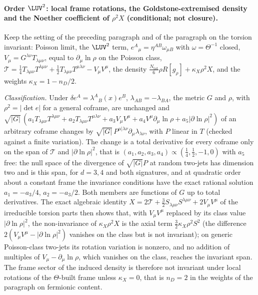 \paragraph{Order \(\LUV^2\): local frame rotations, the Goldstone-extremised density and the Noether coefficient of \(\rho^2X\) (conditional; not closure).}
Keep the setting of the preceding paragraph and of the paragraph on the torsion invariant: Poisson limit, the \(\LUV^2\) term, \(e^A{}_\mu=\eta^{AB}\omega_{\mu B}\) with \(\omega=\Theta^{-1}\) closed, \(V_\mu=G^{\lambda\nu}T_{\lambda\mu\nu}\), equal to \(\partial_\mu\ln\rho\) on the Poisson class, \(\mathcal T=\tfrac14T_{\lambda\mu\nu}T^{\lambda\mu\nu}+\tfrac12T_{\lambda\mu\nu}T^{\mu\lambda\nu}-V_\mu V^\mu\), the density \(\tfrac{N_{\mathrm{tot}}}6\rho R[g_\rho]+\kappa_X\rho^2X\), and the weights \(\kappa_X=1-n_D/2\).

\emph{Classification.} Under \(\delta e^A=\lambda^A{}_B(x)e^B\), \(\lambda_{AB}=-\lambda_{BA}\), the metric \(G\) and \(\rho\), with \(\rho^2=\lvert\det e\rvert\) for a general coframe, are unchanged and \(\sqrt{\lvert G\rvert}\,(a_1T_{\lambda\mu\nu}T^{\lambda\mu\nu}+a_2T_{\lambda\mu\nu}T^{\mu\lambda\nu}+a_3V_\mu V^\mu+a_4V^\mu\partial_\mu\ln\rho+a_5\lvert\partial\ln\rho\rvert^2)\) of an arbitrary coframe changes by \(\sqrt{\lvert G\rvert}\,P^{\mu|\lambda\nu}\partial_\mu\lambda_{\lambda\nu}\), with \(P\) linear in \(T\) (checked against a finite variation). The change is a total derivative for every coframe only on the span of \(\mathcal T\) and \(\lvert\partial\ln\rho\rvert^2\), that is \((a_1,a_2,a_3,a_4)\propto(\tfrac14,\tfrac12,-1,0)\) with \(a_5\) free: the null space of the divergence of \(\sqrt{\lvert G\rvert}P\) at random two-jets has dimension two and is this span, for \(d=3,4\) and both signatures, and at quadratic order about a constant frame the invariance conditions have the exact rational solution \(a_1=-a_3/4\), \(a_2=-a_3/2\). Both members are functions of \(G\) up to total derivatives. The exact algebraic identity \(X=2\mathcal T+\tfrac32S_{\lambda\mu\nu}S^{\lambda\mu\nu}+2V_\mu V^\mu\) of the irreducible torsion parts then shows that, with \(V_\mu V^\mu\) replaced by its class value \(\lvert\partial\ln\rho\rvert^2\), the non-invariance of \(\kappa_X\rho^2X\) is the axial term \(\tfrac32\kappa_X\rho^2S^2\) (the difference \(2(V_\mu V^\mu-\lvert\partial\ln\rho\rvert^2)\) vanishes on the class but is not invariant); on generic Poisson-class two-jets its rotation variation is nonzero, and no addition of multiples of \(V_\mu-\partial_\mu\ln\rho\), which vanishes on the class, reaches the invariant span. The frame sector of the induced density is therefore not invariant under local rotations of the \(\Theta\)-built frame unless \(\kappa_X=0\), that is \(n_D=2\) in the weights of the paragraph on fermionic content.


